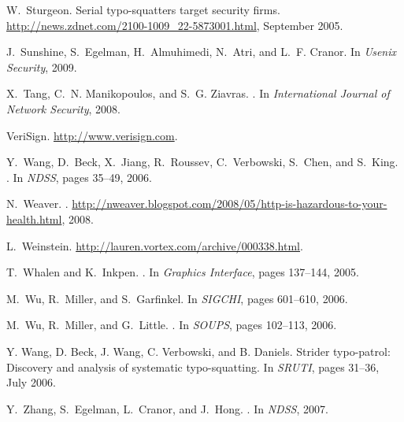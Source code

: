 \documentclass[twocolumn]{article}
\begin{document}
\begin{thebibliography}{10}
W.~Sturgeon.
\newblock Serial typo-squatters target security firms.
\newblock \url{http://news.zdnet.com/2100-1009_22-5873001.html}, September
  2005.

J.~Sunshine, S.~Egelman, H.~Almuhimedi, N.~Atri, and L.~F. Cranor.
\newblock In {\em Usenix Security}, 2009.

X.~Tang, C.~N. Manikopoulos, and S.~G. Ziavras.
.
\newblock In {\em International Journal of Network Security}, 2008.

{VeriSign}.
\newblock \url{http://www.verisign.com}.

Y.~Wang, D.~Beck, X.~Jiang, R.~Roussev, C.~Verbowski, S.~Chen, and S.~King.
.
\newblock In {\em NDSS}, pages 35--49, 2006.

N.~Weaver.
.
\newblock
  \url{http://nweaver.blogspot.com/2008/05/http-is-hazardous-to-your-health.html}, 2008.

L.~Weinstein.
\newblock \url{http://lauren.vortex.com/archive/000338.html}.

T.~Whalen and K.~Inkpen.
.
\newblock In {\em Graphics Interface}, pages 137--144, 2005.

M.~Wu, R.~Miller, and S.~Garfinkel.
\newblock In {\em SIGCHI}, pages 601--610, 2006.

M.~Wu, R.~Miller, and G.~Little.
.
\newblock In {\em SOUPS}, pages 102--113, 2006.

{Y. Wang, D. Beck, J. Wang, C. Verbowski, and B. Daniels}.
\newblock Strider typo-patrol: Discovery and analysis of systematic
  typo-squatting.
\newblock In {\em SRUTI}, pages 31--36, July 2006.

Y.~Zhang, S.~Egelman, L.~Cranor, and J.~Hong.
.
\newblock In {\em NDSS}, 2007.

\end{thebibliography}
\end{document}
